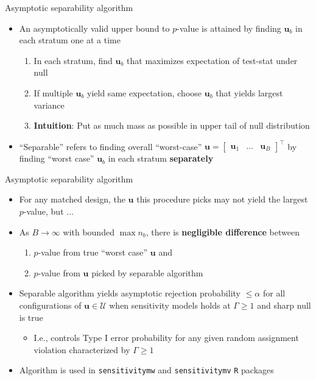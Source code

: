 \documentclass[table, xcolor={dvipsnames}, 9pt]{beamer}
\theoremstyle{newstyle}
\begin{document}
\begin{frame}{Asymptotic separability algorithm}
\vfill
\begin{itemize} \vfill
\item An asymptotically valid upper bound to $p$-value is attained by finding $\bm{u}_b$ in each stratum one at a time \citep{gastwirthetal2000} \vfill
\begin{enumerate} \vfill
\item In each stratum, find $\bm{u}_b$ that maximizes expectation of test-stat under null \vfill
\item If multiple $\bm{u}_b$ yield same expectation, choose $\bm{u}_b$ that yields largest variance \vfill
\item[] \textbf{Intuition}: Put as much mass as possible in upper tail of null distribution \vfill
\end{enumerate} \vfill
\item[$\star$] ``Separable'' refers to finding overall ``worst-case'' $\bm{u} = \begin{bmatrix} \bm{u}_1 & \ldots & \bm{u}_B \end{bmatrix}^{\top}$ by finding ``worst case'' $\bm{u}_b$ in each stratum \textbf{separately} \vfill
\end{itemize} \vfill
\end{frame}
\begin{frame}{Asymptotic separability algorithm}
\vfill
\begin{itemize} \vfill
\item For any matched design, the $\bm{u}$ this procedure picks may not yield the largest $p$-value, but ... \vfill
\item As $B \to \infty$ with bounded $\max n_b$, there is \textbf{negligible difference} between \vfill
\begin{enumerate}
\item $p$-value from true ``worst case'' $\bm{u}$ and \vfill
\item $p$-value from $\bm{u}$ picked by separable algorithm \vfill
\end{enumerate} \vfill
\item Separable algorithm yields asymptotic rejection probability $\leq \alpha$ for all configurations of $\bm{u} \in \mathcal{U}$ when sensitivity models holds at $\Gamma \geq 1$ and sharp null is true \vfill
\begin{itemize} \vfill
\item I.e., controls Type I error probability for any given random assignment violation characterized by $\Gamma \geq 1$ \vfill
\end{itemize} \vfill
\item Algorithm is used in \texttt{sensitivitymw} and \texttt{sensitivitymv} \texttt{R} packages  \vfill
\end{itemize} \vfill
\end{frame}
\end{document}
